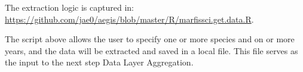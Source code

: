 \documentclass[letterpaper,portrait,11pt]{scrartcl}
\numberwithin{equation}{section}    %
\numberwithin{figure}{section}    %
\numberwithin{table}{section}       %
\begin{document}
The extraction logic is captured in: \\
\url{https://github.com/jae0/aegis/blob/master/R/marfissci.get.data.R}.

The script above allows the user to specify one or more species and on or more years, and the data will be extracted and saved in a local file.  This file serves as the input to the next step \textendash Data Layer Aggregation.






\end{document}
